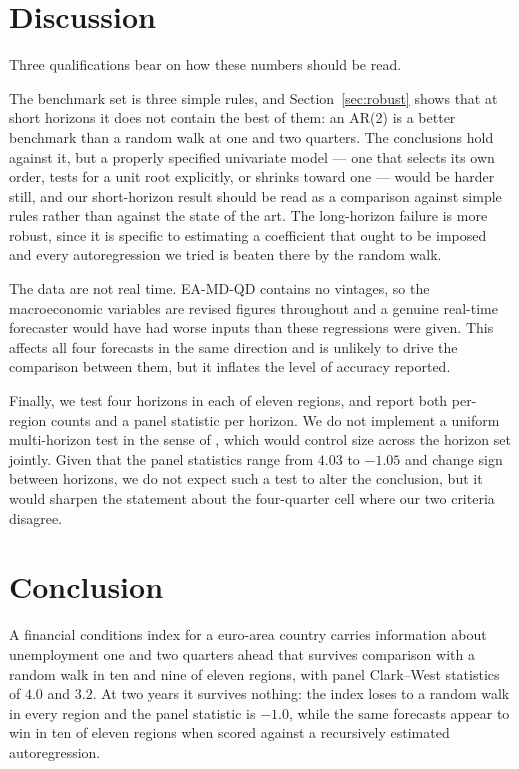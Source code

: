 \documentclass[12pt]{article}
\begin{document}
\section{Discussion}
\label{sec:disc}

Three qualifications bear on how these numbers should be read.

The benchmark set is three simple rules, and Section~\ref{sec:robust} shows
that at short horizons it does not contain the best of them: an AR(2) is a
better benchmark than a random walk at one and two quarters. The conclusions
hold against it, but a properly specified univariate model --- one that selects
its own order, tests for a unit root explicitly, or shrinks toward one --- would
be harder still, and our short-horizon result should be read as a comparison
against simple rules rather than against the state of the art. The long-horizon
failure is more robust, since it is specific to estimating a coefficient that
ought to be imposed and every autoregression we tried is beaten there by the
random walk.

The data are not real time. EA-MD-QD contains no vintages, so the macroeconomic
variables are revised figures throughout and a genuine real-time forecaster
would have had worse inputs than these regressions were given. This affects all
four forecasts in the same direction and is unlikely to drive the comparison
between them, but it inflates the level of accuracy reported.

Finally, we test four horizons in each of eleven regions, and report both
per-region counts and a panel statistic per horizon. We do not implement a
uniform multi-horizon test in the sense of \citet{quaedvlieg2021}, which would
control size across the horizon set jointly. Given that the panel statistics
range from $4.03$ to $-1.05$ and change sign between horizons, we do not expect
such a test to alter the conclusion, but it would sharpen the statement about
the four-quarter cell where our two criteria disagree.

\section{Conclusion}

A financial conditions index for a euro-area country carries information about
unemployment one and two quarters ahead that survives comparison with a random
walk in ten and nine of eleven regions, with panel Clark--West statistics of
$4.0$ and $3.2$. At two years it survives nothing: the index loses to a random
walk in every region and the panel statistic is $-1.0$, while the same
forecasts appear to win in ten of eleven regions when scored against a
recursively estimated autoregression.
\end{document}

